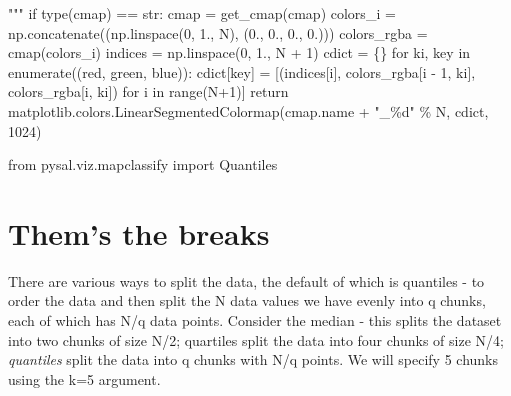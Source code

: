 \documentclass[
  letterpaper,
  DIV=11,
  numbers=noendperiod]{scrreprt}
\newenvironment{Shaded}{\begin{snugshade}}{\end{snugshade}}
\newcommand{\BuiltInTok}[1]{\textcolor[rgb]{0.00,0.23,0.31}{#1}}
\newcommand{\CommentTok}[1]{\textcolor[rgb]{0.37,0.37,0.37}{#1}}
\newcommand{\ControlFlowTok}[1]{\textcolor[rgb]{0.00,0.23,0.31}{#1}}
\newcommand{\DecValTok}[1]{\textcolor[rgb]{0.68,0.00,0.00}{#1}}
\newcommand{\FloatTok}[1]{\textcolor[rgb]{0.68,0.00,0.00}{#1}}
\newcommand{\ImportTok}[1]{\textcolor[rgb]{0.00,0.46,0.62}{#1}}
\newcommand{\KeywordTok}[1]{\textcolor[rgb]{0.00,0.23,0.31}{#1}}
\newcommand{\NormalTok}[1]{\textcolor[rgb]{0.00,0.23,0.31}{#1}}
\newcommand{\OperatorTok}[1]{\textcolor[rgb]{0.37,0.37,0.37}{#1}}
\newcommand{\SpecialCharTok}[1]{\textcolor[rgb]{0.37,0.37,0.37}{#1}}
\newcommand{\StringTok}[1]{\textcolor[rgb]{0.13,0.47,0.30}{#1}}
\begin{document}
\begin{Shaded}
\begin{Highlighting}[]
\CommentTok{    """}
    \ControlFlowTok{if} \BuiltInTok{type}\NormalTok{(cmap) }\OperatorTok{==} \BuiltInTok{str}\NormalTok{:}
\NormalTok{        cmap }\OperatorTok{=}\NormalTok{ get\_cmap(cmap)}
\NormalTok{    colors\_i }\OperatorTok{=}\NormalTok{ np.concatenate((np.linspace(}\DecValTok{0}\NormalTok{, }\FloatTok{1.}\NormalTok{, N), (}\FloatTok{0.}\NormalTok{, }\FloatTok{0.}\NormalTok{, }\FloatTok{0.}\NormalTok{, }\FloatTok{0.}\NormalTok{)))}
\NormalTok{    colors\_rgba }\OperatorTok{=}\NormalTok{ cmap(colors\_i)}
\NormalTok{    indices }\OperatorTok{=}\NormalTok{ np.linspace(}\DecValTok{0}\NormalTok{, }\FloatTok{1.}\NormalTok{, N }\OperatorTok{+} \DecValTok{1}\NormalTok{)}
\NormalTok{    cdict }\OperatorTok{=}\NormalTok{ \{\}}
    \ControlFlowTok{for}\NormalTok{ ki, key }\KeywordTok{in} \BuiltInTok{enumerate}\NormalTok{((}\StringTok{\textquotesingle{}red\textquotesingle{}}\NormalTok{, }\StringTok{\textquotesingle{}green\textquotesingle{}}\NormalTok{, }\StringTok{\textquotesingle{}blue\textquotesingle{}}\NormalTok{)):}
\NormalTok{        cdict[key] }\OperatorTok{=}\NormalTok{ [(indices[i], colors\_rgba[i }\OperatorTok{{-}} \DecValTok{1}\NormalTok{, ki], colors\_rgba[i, ki]) }\ControlFlowTok{for}\NormalTok{ i }\KeywordTok{in} \BuiltInTok{range}\NormalTok{(N}\OperatorTok{+}\DecValTok{1}\NormalTok{)]}
    \ControlFlowTok{return}\NormalTok{ matplotlib.colors.LinearSegmentedColormap(cmap.name }\OperatorTok{+} \StringTok{"\_}\SpecialCharTok{\%d}\StringTok{"} \OperatorTok{\%}\NormalTok{ N, cdict, }\DecValTok{1024}\NormalTok{)}
\end{Highlighting}
\end{Shaded}

\begin{Shaded}
\begin{Highlighting}[]
\ImportTok{from}\NormalTok{ pysal.viz.mapclassify }\ImportTok{import}\NormalTok{ Quantiles}
\end{Highlighting}
\end{Shaded}

\hypertarget{thems-the-breaks}{%
\section{Them's the breaks}\label{thems-the-breaks}}

There are various ways to split the data, the default of which is
quantiles - to order the data and then split the N data values we have
evenly into q chunks, each of which has N/q data points. Consider the
median - this splits the dataset into two chunks of size N/2; quartiles
split the data into four chunks of size N/4; \emph{quantiles} split the
data into q chunks with N/q points. We will specify 5 chunks using the
k=5 argument.
\end{document}
